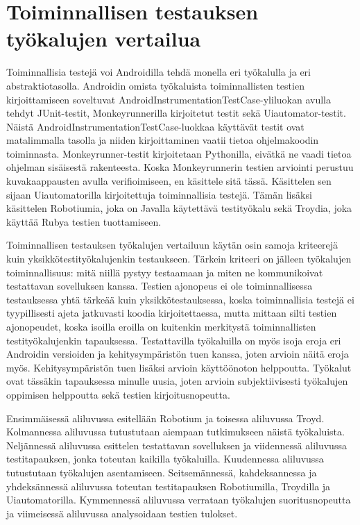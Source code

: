 \section{Toiminnallisen testauksen työkalujen vertailua}

Toiminnallisia testejä voi Androidilla tehdä monella eri työkalulla ja eri abstraktiotasolla. Androidin omista työkaluista toiminnallisten testien kirjoittamiseen soveltuvat AndroidInstrumentationTestCase-yliluokan avulla tehdyt JUnit-testit, Monkeyrunnerilla kirjoitetut testit sekä Uiautomator-testit. Näistä AndroidInstrumentationTestCase-luokkaa käyttävät testit ovat matalimmalla tasolla ja niiden kirjoittaminen vaatii tietoa ohjelmakoodin toiminnasta. Monkeyrunner-testit kirjoitetaan Pythonilla, eivätkä ne vaadi tietoa ohjelman sisäisestä rakenteesta. Koska Monkeyrunnerin testien arviointi perustuu kuvakaappausten avulla verifioimiseen, en käsittele sitä tässä. Käsittelen sen sijaan Uiautomatorilla kirjoitettuja toiminnallisia testejä. Tämän lisäksi käsittelen Robotiumia, joka on Javalla käytettävä testityökalu sekä Troydia, joka käyttää Rubya testien tuottamiseen.

Toiminnallisen testauksen työkalujen vertailuun käytän osin samoja kriteerejä kuin yksikkötestityökalujenkin testaukseen. Tärkein kriteeri on jälleen työkalujen toiminnallisuus: mitä niillä pystyy testaamaan ja miten ne kommunikoivat testattavan sovelluksen kanssa. Testien ajonopeus ei ole toiminnallisessa testauksessa yhtä tärkeää kuin yksikkötestauksessa, koska toiminnallisia testejä ei tyypillisesti ajeta jatkuvasti koodia kirjoitettaessa, mutta mittaan silti testien ajonopeudet, koska isoilla eroilla on kuitenkin merkitystä toiminnallisten testityökalujenkin tapauksessa. Testattavilla työkaluilla on myös isoja eroja eri Androidin versioiden ja kehitysympäristön tuen kanssa, joten arvioin näitä eroja myös. Kehitysympäristön tuen lisäksi arvioin käyttöönoton helppoutta. Työkalut ovat tässäkin tapauksessa minulle uusia, joten arvioin subjektiivisesti työkalujen oppimisen helppoutta sekä testien kirjoitusnopeutta.

Ensimmäisessä aliluvussa esitellään Robotium ja toisessa aliluvussa Troyd. Kolmannessa aliluvussa tutustutaan aiempaan tutkimukseen näistä työkaluista. Neljännessä aliluvussa esittelen testattavan sovelluksen ja viidennessä aliluvussa testitapauksen, jonka toteutan kaikilla työkaluilla. Kuudennessa aliluvussa tutustutaan työkalujen asentamiseen. Seitsemännessä, kahdeksannessa ja yhdeksännessä aliluvussa toteutan testitapauksen Robotiumilla, Troydilla ja Uiautomatorilla. Kymmennessä aliluvussa verrataan työkalujen suoritusnopeutta ja viimeisessä aliluvussa analysoidaan testien tulokset.

